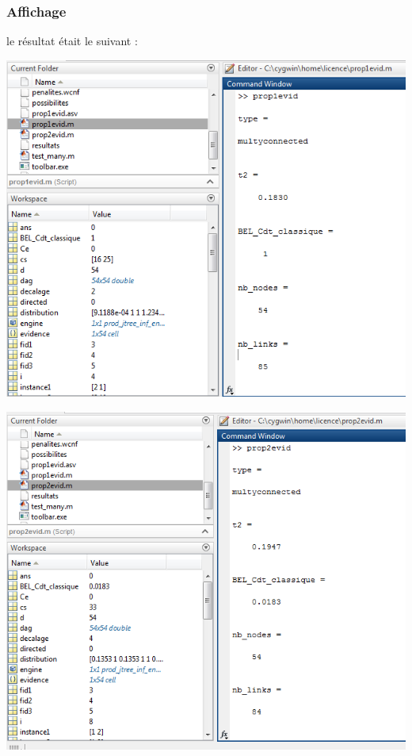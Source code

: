 \documentclass[12pt,a4paper,oneside]{book}
\begin{document}
	\subsubsection{Affichage}
	le résultat était le suivant :
	
	
	\begin{frame}{}
		\centering
		\begin{minipage}[H]{0.5\linewidth}
			\includegraphics[width=1\textwidth]{screens/prodevid1affichge.png}%
			\label{labelname}%
		\end{minipage}
		\hspace{0.5cm}
		\begin{minipage}[H]{0.5\linewidth}
			\includegraphics[width=1\textwidth]{screens/prodevid2affichage.png}%
			\label{labelname}%
		\end{minipage}
	\end{frame}
\end{document}
